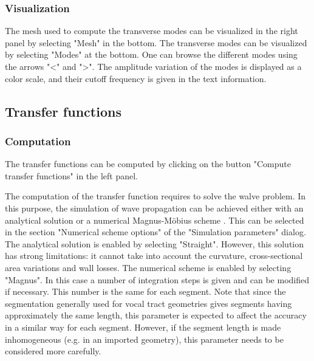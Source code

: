 \documentclass[]{article}
\begin{document}
	\subsubsection{Visualization}
	
	The mesh used to compute the transverse modes can be visualized
	in the right panel by selecting "Mesh" in the bottom.
	The transverse modes can be visualized by 
	selecting "Modes" at the bottom. 
	One can browse the different modes using the arrows "<" and ">".
	The amplitude variation of the modes is displayed as a color scale, and their cutoff 
	frequency is given in the text information.
	
	\subsection{Transfer functions}
	
	\subsubsection{Computation}
	
	The transfer functions can be computed by clicking on the button 
	"Compute transfer functions" in the left panel.
	
	The computation of the transfer function requires to solve the 
	walve problem. In this purpose, the simulation of wave propagation can be achieved either with an analytical 
	solution \cite{blandin2015effects} or a numerical Magnus-Möbius 
	scheme \cite{PAGNEUX20101834}.
	This can be selected in the section "Numerical scheme options" of
	the "Simulation parameters" dialog. The analytical solution is 
	enabled by selecting "Straight". However, this solution has strong limitations: it cannot take into account the curvature, cross-sectional area variations and 
	wall losses. The numerical scheme is enabled by selecting "Magnus".
	In this case a number of integration steps is given and can be 
	modified if necessary. This number is the same for each segment.
	Note that since the segmentation generally used for vocal tract geometries gives segments having approximately the same length, 
	this parameter is expected to affect the accuracy in a similar way
	for each segment. However, if the 
	segment length is made inhomogeneous (e.g. in an imported geometry), this parameter 
	needs to be considered more carefully.
	
\end{document}
